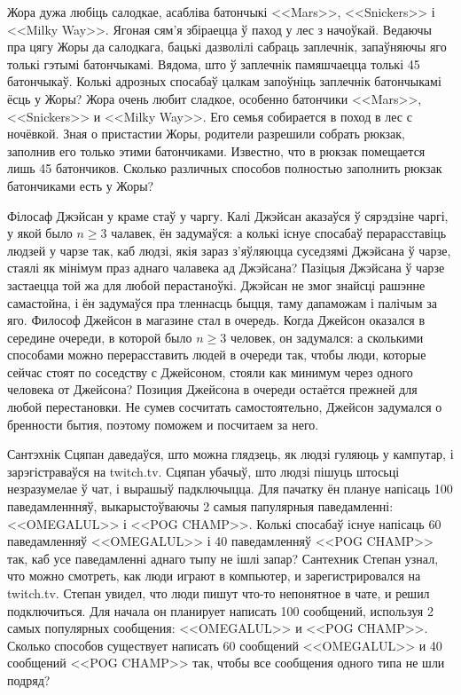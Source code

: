 \documentclass[12pt, a4paper]{article}
\begin{document}
\begin{problemList}
\bigskip

\problemItemSimple
{Жора дужа любіць салодкае, асабліва батончыкі <<Mars>>, <<Snickers>> і <<Milky Way>>.
Ягоная сям'я збіраецца ў паход у лес з начоўкай.
Ведаючы пра цягу Жоры да салодкага, бацькі дазволілі сабраць заплечнік, запаўняючы яго толькі гэтымі батончыкамі.
Вядома, што ў заплечнік памяшчаецца толькі 45 батончыкаў.
Колькі адрозных спосабаў цалкам запоўніць заплечнік батончыкамі ёсць у Жоры?}
{Жора очень любит сладкое, особенно батончики <<Mars>>, <<Snickers>> и <<Milky Way>>.
Его семья собирается в поход в лес с ночёвкой.
Зная о пристастии Жоры, родители разрешили собрать рюкзак, заполнив его только этими батончиками.
Известно, что в рюкзак помещается лишь 45 батончиков.
Сколько различных способов полностью заполнить рюкзак батончиками есть у Жоры?}

\bigskip

\problemItemSimple
{Філосаф Джэйсан у краме стаў у чаргу.
Калі Джэйсан аказаўся ў сярэдзіне чаргі, у якой было $n \ge 3$ чалавек, ён задумаўся: а колькі існуе спосабаў перарасставіць людзей у чарзе так,
каб людзі, якія зараз з'яўляюцца суседзямі Джэйсана ў чарзе, стаялі як мінімум праз аднаго чалавека ад Джэйсана?
Пазіцыя Джэйсана ў чарзе застаецца той жа для любой перастаноўкі.
Джэйсан не змог знайсці рашэнне самастойна, і ён задумаўся пра тленнасць быцця, таму дапаможам і палічым за яго.}
{Философ Джейсон в магазине стал в очередь.
Когда Джейсон оказался в середине очереди, в которой было $n \ge 3$ человек, он задумался: а сколькими способами можно перерасставить людей в очереди так,
чтобы люди, которые сейчас стоят по соседству с Джейсоном, стояли как минимум через одного человека от Джейсона?
Позиция Джейсона в очереди остаётся прежней для любой перестановки.
Не сумев сосчитать самостоятельно, Джейсон задумался о бренности бытия, поэтому поможем и посчитаем за него.}

\bigskip

\problemItemSimple
{Сантэхнік Сцяпан даведаўся, што можна глядзець, як людзі гуляюць у кампутар, і зарэгістраваўся на twitch.tv. Сцяпан убачыў, што людзі пішуць штосьці незразумелае ў чат, і вырашыў падключыцца.
Для пачатку ён плануе напісаць 100 паведамленнняў, выкарыстоўваючы 2 самыя папулярныя паведамленні: <<OMEGALUL>> і <<POG CHAMP>>.
Колькі спосабаў існуе напісаць 60 паведамленняў <<OMEGALUL>> і 40 паведамленняў <<POG CHAMP>> так, каб усе паведамленні аднаго тыпу не ішлі запар?}
{Сантехник Степан узнал, что можно смотреть, как люди играют в компьютер, и зарегистрировался на twitch.tv.
Степан увидел, что люди пишут что-то непонятное в чате, и решил подключиться.
Для начала он планирует написать 100 сообщений, используя 2 самых популярных сообщения: <<OMEGALUL>> и <<POG CHAMP>>.
Сколько способов существует написать 60 сообщений <<OMEGALUL>> и 40 сообщений <<POG CHAMP>> так, чтобы все сообщения одного типа не шли подряд?}

\end{problemList}
\end{document}
